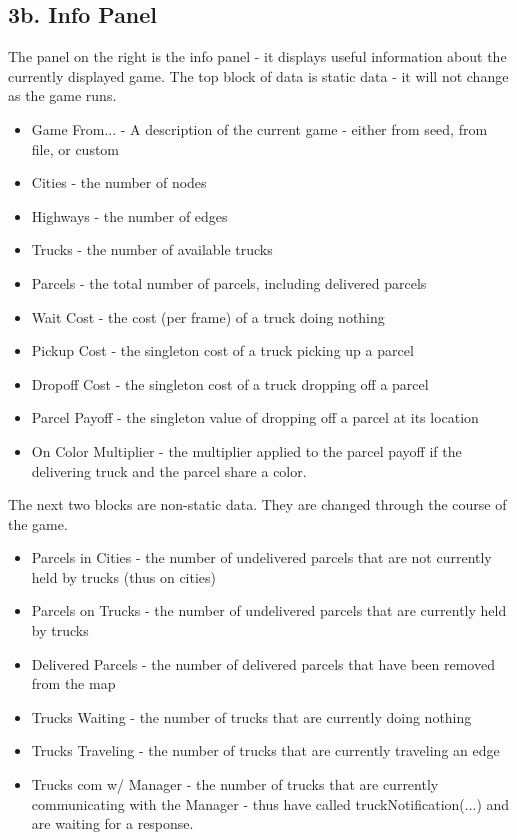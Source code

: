 \documentclass[11pt]{article}
\begin{document}
\subsection{3b. Info Panel}
The panel on the right is the info panel - it displays useful information about the currently displayed game.
The top block of data is static data - it will not change as the game runs.
\begin{itemize}
\item Game From... - A description of the current game - either from seed, from file, or custom
\item Cities - the number of nodes
\item Highways - the number of edges
\item Trucks - the number of available trucks
\item Parcels - the total number of parcels, including delivered parcels
\item Wait Cost - the cost (per frame) of a truck doing nothing
\item Pickup Cost - the singleton cost of a truck picking up a parcel
\item Dropoff Cost - the singleton cost of a truck dropping off a parcel
\item Parcel Payoff - the singleton value of dropping off a parcel at its location
\item On Color Multiplier - the multiplier applied to the parcel payoff if the delivering truck and the parcel share a color.
\end{itemize}

The next two blocks are non-static data. They are changed through the course of the game.
\begin{itemize}
\item Parcels in Cities - the number of undelivered parcels that are not currently held by trucks (thus on cities)
\item Parcels on Trucks - the number of undelivered parcels that are currently held by trucks
\item Delivered Parcels - the number of delivered parcels that have been removed from the map
\item Trucks Waiting - the number of trucks that are currently doing nothing
\item Trucks Traveling - the number of trucks that are currently traveling an edge
\item Trucks com w/ Manager - the number of trucks that are currently communicating with the Manager - thus have called truckNotification(...) and are waiting for a response.
\end{itemize}
\end{document}

